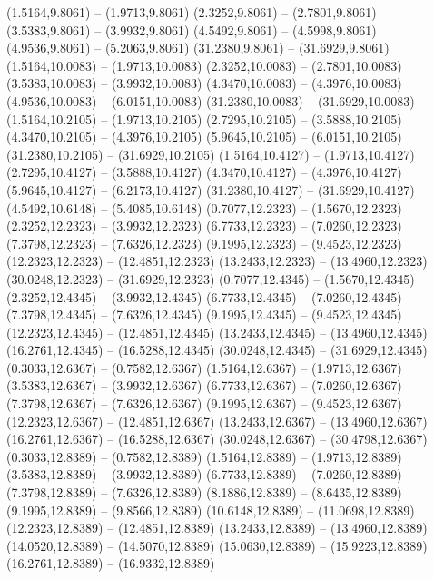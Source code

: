 {\begin{scope}[shift={(#1,#2)}]
    (1.5164,9.8061) -- (1.9713,9.8061)
    (2.3252,9.8061) -- (2.7801,9.8061)
    (3.5383,9.8061) -- (3.9932,9.8061)
    (4.5492,9.8061) -- (4.5998,9.8061)
    (4.9536,9.8061) -- (5.2063,9.8061)
    (31.2380,9.8061) -- (31.6929,9.8061)
    (1.5164,10.0083) -- (1.9713,10.0083)
    (2.3252,10.0083) -- (2.7801,10.0083)
    (3.5383,10.0083) -- (3.9932,10.0083)
    (4.3470,10.0083) -- (4.3976,10.0083)
    (4.9536,10.0083) -- (6.0151,10.0083)
    (31.2380,10.0083) -- (31.6929,10.0083)
    (1.5164,10.2105) -- (1.9713,10.2105)
    (2.7295,10.2105) -- (3.5888,10.2105)
    (4.3470,10.2105) -- (4.3976,10.2105)
    (5.9645,10.2105) -- (6.0151,10.2105)
    (31.2380,10.2105) -- (31.6929,10.2105)
    (1.5164,10.4127) -- (1.9713,10.4127)
    (2.7295,10.4127) -- (3.5888,10.4127)
    (4.3470,10.4127) -- (4.3976,10.4127)
    (5.9645,10.4127) -- (6.2173,10.4127)
    (31.2380,10.4127) -- (31.6929,10.4127)
    (4.5492,10.6148) -- (5.4085,10.6148)
    (0.7077,12.2323) -- (1.5670,12.2323)
    (2.3252,12.2323) -- (3.9932,12.2323)
    (6.7733,12.2323) -- (7.0260,12.2323)
    (7.3798,12.2323) -- (7.6326,12.2323)
    (9.1995,12.2323) -- (9.4523,12.2323)
    (12.2323,12.2323) -- (12.4851,12.2323)
    (13.2433,12.2323) -- (13.4960,12.2323)
    (30.0248,12.2323) -- (31.6929,12.2323)
    (0.7077,12.4345) -- (1.5670,12.4345)
    (2.3252,12.4345) -- (3.9932,12.4345)
    (6.7733,12.4345) -- (7.0260,12.4345)
    (7.3798,12.4345) -- (7.6326,12.4345)
    (9.1995,12.4345) -- (9.4523,12.4345)
    (12.2323,12.4345) -- (12.4851,12.4345)
    (13.2433,12.4345) -- (13.4960,12.4345)
    (16.2761,12.4345) -- (16.5288,12.4345)
    (30.0248,12.4345) -- (31.6929,12.4345)
    (0.3033,12.6367) -- (0.7582,12.6367)
    (1.5164,12.6367) -- (1.9713,12.6367)
    (3.5383,12.6367) -- (3.9932,12.6367)
    (6.7733,12.6367) -- (7.0260,12.6367)
    (7.3798,12.6367) -- (7.6326,12.6367)
    (9.1995,12.6367) -- (9.4523,12.6367)
    (12.2323,12.6367) -- (12.4851,12.6367)
    (13.2433,12.6367) -- (13.4960,12.6367)
    (16.2761,12.6367) -- (16.5288,12.6367)
    (30.0248,12.6367) -- (30.4798,12.6367)
    (0.3033,12.8389) -- (0.7582,12.8389)
    (1.5164,12.8389) -- (1.9713,12.8389)
    (3.5383,12.8389) -- (3.9932,12.8389)
    (6.7733,12.8389) -- (7.0260,12.8389)
    (7.3798,12.8389) -- (7.6326,12.8389)
    (8.1886,12.8389) -- (8.6435,12.8389)
    (9.1995,12.8389) -- (9.8566,12.8389)
    (10.6148,12.8389) -- (11.0698,12.8389)
    (12.2323,12.8389) -- (12.4851,12.8389)
    (13.2433,12.8389) -- (13.4960,12.8389)
    (14.0520,12.8389) -- (14.5070,12.8389)
    (15.0630,12.8389) -- (15.9223,12.8389)
    (16.2761,12.8389) -- (16.9332,12.8389)

\end{scope}}
